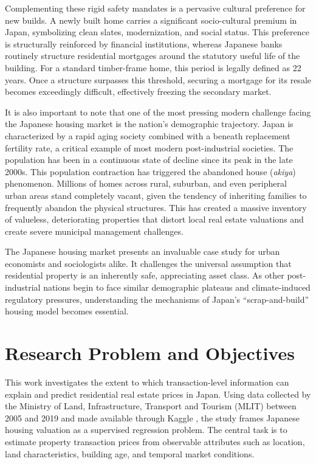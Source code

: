 \documentclass[12pt]{article}
\begin{document}
Complementing these rigid safety mandates is a pervasive cultural preference for new builds. A newly built home carries
a significant socio-cultural premium in Japan, symbolizing clean slates, modernization, and social status. This
preference is structurally reinforced by financial institutions, whereas Japanese banks routinely structure residential
mortgages around the statutory useful life of the building. For a standard timber-frame home, this period is legally
defined as 22 years. Once a structure surpasses this threshold, securing a mortgage for its resale becomes exceedingly
difficult, effectively freezing the secondary market.

It is also important to note that one of the most pressing modern challenge facing the Japanese housing market is the
nation's demographic trajectory. Japan is characterized by a rapid aging society combined with a beneath replacement
fertility rate, a critical example of most modern post-industrial societies. The population has been in a continuous
state of decline since its peak in the late 2000s. This population contraction has triggered the abandoned house
(\textit{akiya}) phenomenon. Millions of homes across rural, suburban, and even peripheral urban areas stand completely
vacant, given the tendency of inheriting families to frequently abandon the physical structures. This has created a
massive inventory of valueless, deteriorating properties that distort local real estate valuations and create severe
municipal management challenges.

The Japanese housing market presents an invaluable case study for urban economists and sociologists alike. It challenges
the universal assumption that residential property is an inherently safe, appreciating asset class. As other
post-industrial nations begin to face similar demographic plateaus and climate-induced regulatory pressures,
understanding the mechanisms of Japan’s ``scrap-and-build'' housing model becomes essential. 

\section{Research Problem and Objectives}
This work investigates the extent to which transaction-level information can explain and predict residential real estate
prices in Japan. Using data collected by the Ministry of Land, Infrastructure, Transport and Tourism (MLIT) between 2005
and 2019 and made available through Kaggle \cite{nishiodens_japan_real_estate}, the study frames Japanese housing
valuation as a supervised regression problem. The central task is to estimate property transaction prices from
observable attributes such as location, land characteristics, building age, and temporal market conditions.
\end{document}
